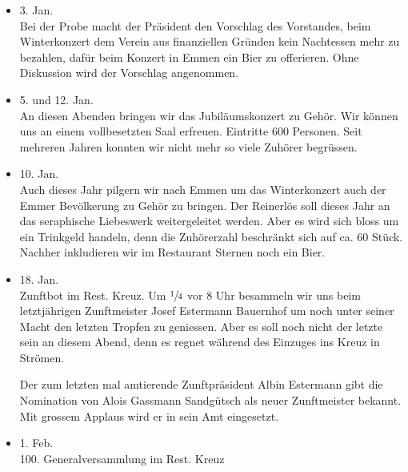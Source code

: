 \begin{history}


    \begin{itemize}
        \item[]3. Jan.\\
        Bei der Probe macht der Präsident den Vorschlag des Vorstandes, beim
        Winterkonzert dem Verein aus finanziellen Gründen kein Nachtessen mehr
        zu bezahlen, dafür beim Konzert in Emmen ein Bier zu offerieren. Ohne
        Diskussion wird der Vorschlag angenommen.

        \item[]5. und 12. Jan.\\
        An diesen Abenden bringen wir das Jubiläumskonzert zu Gehör. Wir können
        uns an einem vollbesetzten Saal erfreuen. Eintritte 600 Personen. Seit
        mehreren Jahren konnten wir nicht mehr so viele Zuhörer begrüssen.

        \item[]10. Jan.\\
        Auch dieses Jahr pilgern wir nach Emmen um das Winterkonzert auch der
        Emmer Bevölkerung zu Gehör zu bringen. Der Reinerlös soll dieses Jahr an
        das seraphische Liebeswerk weitergeleitet werden. Aber es wird sich
        bloss um ein Trinkgeld handeln, denn die Zuhörerzahl beschränkt sich auf
        ca. 60 Stück. Nachher inkludieren wir im Restaurant Sternen noch ein
        Bier.

        \item[]18. Jan.\\
        Zunftbot im Rest. Kreuz. Um $\sfrac{1}{4}$ vor 8 Uhr besammeln wir uns
        beim letztjährigen Zunftmeister Josef Estermann Bauernhof um noch unter
        seiner Macht den letzten Tropfen zu geniessen. Aber es soll noch nicht
        der letzte sein an diesem Abend, denn es regnet während des Einzuges ins
        Kreuz in Strömen.

        Der zum letzten mal amtierende Zunftpräsident Albin Estermann gibt die
        Nomination von Alois Gassmann Sandgütsch als neuer Zunftmeister bekannt.
        Mit grossem Applaus wird er in sein Amt eingesetzt.

        \item[]1. Feb.\\
        100. Generalversammlung im Rest. Kreuz


\end{itemize}
\end{history}

